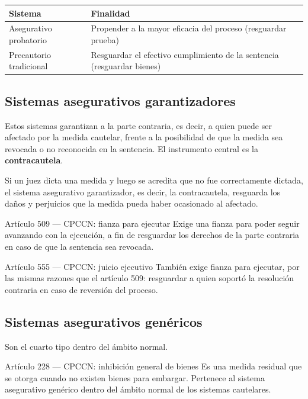 \documentclass[12pt,oneside]{book}
\begin{document}
\begin{table}[H]
\centering
\begin{tabularx}{\textwidth}{>{\raggedright\arraybackslash}p{} Y}
\toprule
\textbf{Sistema} & \textbf{Finalidad} \\
\midrule
Asegurativo probatorio & Propender a la mayor eficacia del proceso (resguardar prueba) \\
Precautorio tradicional & Resguardar el efectivo cumplimiento de la sentencia (resguardar bienes) \\
\bottomrule
\end{tabularx}
\end{table}

\subsection{Sistemas asegurativos garantizadores}

Estos sistemas garantizan a la parte contraria, es decir, a quien puede ser afectado por la medida cautelar, frente a la posibilidad de que la medida sea revocada o no reconocida en la sentencia. El instrumento central es la \textbf{contracautela}.

Si un juez dicta una medida y luego se acredita que no fue correctamente dictada, el sistema asegurativo garantizador, es decir, la contracautela, resguarda los daños y perjuicios que la medida pueda haber ocasionado al afectado.

\begin{normativa}{Artículo 509 --- CPCCN: fianza para ejecutar}
Exige una fianza para poder seguir avanzando con la ejecución, a fin de resguardar los derechos de la parte contraria en caso de que la sentencia sea revocada.
\end{normativa}

\begin{normativa}{Artículo 555 --- CPCCN: juicio ejecutivo}
También exige fianza para ejecutar, por las mismas razones que el artículo 509: resguardar a quien soportó la resolución contraria en caso de reversión del proceso.
\end{normativa}

\subsection{Sistemas asegurativos genéricos}

Son el cuarto tipo dentro del ámbito normal.

\begin{normativa}{Artículo 228 --- CPCCN: inhibición general de bienes}
Es una medida residual que se otorga cuando no existen bienes para embargar. Pertenece al sistema asegurativo genérico dentro del ámbito normal de los sistemas cautelares.
\end{normativa}
\end{document}
